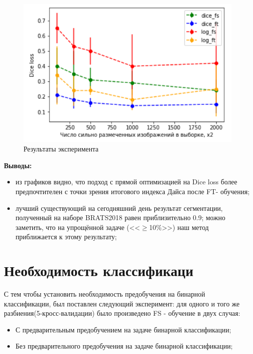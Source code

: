 \begin{figure}[h!] 
  \center
  \includegraphics [scale=1.2] {images/plot_results.png}
  \caption{ Результаты эксперимента} 
\end{figure}

{\bf Выводы:} 

\begin{itemize}
    \item из графиков видно, что подход с прямой оптимизацией на Dice loss более предпочтителен с точки зрения итогового индекса Дайса после FT- обучения;
    \item лучший существующий на сегодняшний день результат сегментации, полученный на наборе BRATS2018 равен приблизительно 0.9; можно заметить, что на упрощённой задаче (<<$\ge$10\%>>) наш метод приближается к этому результату; 
\end{itemize}

\section{Необходимость классификаци}

С тем чтобы установить необходимость предобучения на бинарной классификации, был поставлен следующий эксперимент: для одного и того же разбиения(5-кросс-валидации) было произведено FS - обучение в двух случая:
\begin{itemize}
    \item С предварительным предобучением на задаче бинарной классификации;
    \item Без предварительного предобучения на задаче бинарной классификации;
\end{itemize}



